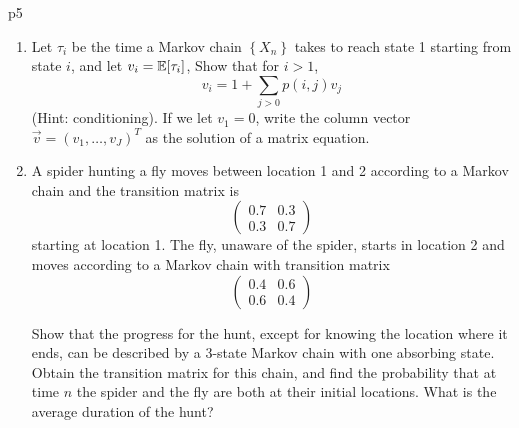 \documentclass[a4paper, 11pt]{article}
\begin{document}


\begin{problem}{%
}{p5%
}
\begin{enumerate}[label=(\alph*)]
\item Let $\tau_i$ be the time a Markov chain $\left\{X_n\right\}$ takes to reach state 1 starting from state $i$, and let $v_i=\mathbb{E}[\tau_i]$, Show that for $i>1$,
$$
v_i=1+\sum_{j>0} p(i, j) v_j
$$
(Hint: conditioning). If we let $v_1=0$, write the column vector $\vec{v}=\left(v_1, \ldots, v_J\right)^T$ as the solution of a matrix equation.
\item A spider hunting a fly moves between location 1 and 2 according to a Markov chain and the transition matrix is
$$
\left(\begin{array}{ll}
	0.7 & 0.3 \\
	0.3 & 0.7
\end{array}\right)
$$
starting at location 1. The fly, unaware of the spider, starts in location 2 and moves according to a Markov chain with transition matrix
$$
\left(\begin{array}{ll}
	0.4 & 0.6 \\
	0.6 & 0.4
\end{array}\right)
$$

Show that the progress for the hunt, except for knowing the location where it ends, can be described by a 3-state Markov chain with one absorbing state. Obtain the transition matrix for this chain, and find the probability that at time $n$ the spider and the fly are both at their initial locations. What is the average duration of the hunt?
\end{enumerate}
\end{problem}
\end{document}
